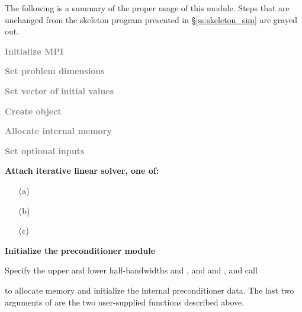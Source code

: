 The following is a summary of the proper usage of this module. Steps that are
unchanged from the skeleton program presented in \S\ref{ss:skeleton_sim} are grayed out.
\begin{Steps}
\item 
  \textcolor{gray}{\bf Initialize MPI}

\item
  \textcolor{gray}{\bf Set problem dimensions}

\item
  \textcolor{gray}{\bf Set vector of initial values}
 
\item
  \textcolor{gray}{\bf Create {\cvode} object}

\item
  \textcolor{gray}{\bf Allocate internal memory}

\item
  \textcolor{gray}{\bf Set optional inputs}

\item \label{i:bbdpre_attach}
  {\bf Attach iterative linear solver, one of:}

  \begin{itemize}
  \item[(a) ] 
  \item[(b) ] 
  \item[(c) ] 
  \end{itemize}


\item \label{i:bbdpre_init}
  {\bf Initialize the {\cvbbdpre} preconditioner module}

  Specify the upper and lower half-bandwidths  and , and
   and , and call 


   to allocate memory and initialize the internal preconditioner data.
   The last two arguments of  are the two user-supplied 
   functions described above.


\end{Steps}
